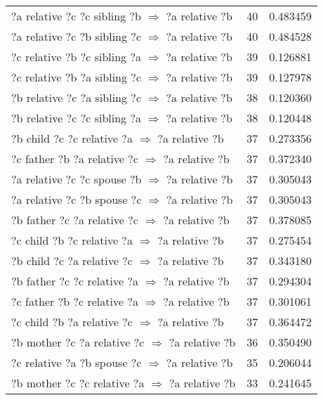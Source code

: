 \begin{longtable}{lrr}
 ?a  relative  ?c  ?c  sibling  ?b   $\Rightarrow$ ?a  relative  ?b &           40 &        0.483459 \\
 ?a  relative  ?c  ?b  sibling  ?c   $\Rightarrow$ ?a  relative  ?b &           40 &        0.484528 \\
 ?c  relative  ?b  ?c  sibling  ?a   $\Rightarrow$ ?a  relative  ?b &           39 &        0.126881 \\
 ?c  relative  ?b  ?a  sibling  ?c   $\Rightarrow$ ?a  relative  ?b &           39 &        0.127978 \\
 ?b  relative  ?c  ?a  sibling  ?c   $\Rightarrow$ ?a  relative  ?b &           38 &        0.120360 \\
 ?b  relative  ?c  ?c  sibling  ?a   $\Rightarrow$ ?a  relative  ?b &           38 &        0.120448 \\
   ?b  child  ?c  ?c  relative  ?a   $\Rightarrow$ ?a  relative  ?b &           37 &        0.273356 \\
  ?c  father  ?b  ?a  relative  ?c   $\Rightarrow$ ?a  relative  ?b &           37 &        0.372340 \\
  ?a  relative  ?c  ?c  spouse  ?b   $\Rightarrow$ ?a  relative  ?b &           37 &        0.305043 \\
  ?a  relative  ?c  ?b  spouse  ?c   $\Rightarrow$ ?a  relative  ?b &           37 &        0.305043 \\
  ?b  father  ?c  ?a  relative  ?c   $\Rightarrow$ ?a  relative  ?b &           37 &        0.378085 \\
   ?c  child  ?b  ?c  relative  ?a   $\Rightarrow$ ?a  relative  ?b &           37 &        0.275454 \\
   ?b  child  ?c  ?a  relative  ?c   $\Rightarrow$ ?a  relative  ?b &           37 &        0.343180 \\
  ?b  father  ?c  ?c  relative  ?a   $\Rightarrow$ ?a  relative  ?b &           37 &        0.294304 \\
  ?c  father  ?b  ?c  relative  ?a   $\Rightarrow$ ?a  relative  ?b &           37 &        0.301061 \\
   ?c  child  ?b  ?a  relative  ?c   $\Rightarrow$ ?a  relative  ?b &           37 &        0.364472 \\
  ?b  mother  ?c  ?a  relative  ?c   $\Rightarrow$ ?a  relative  ?b &           36 &        0.350490 \\
  ?c  relative  ?a  ?b  spouse  ?c   $\Rightarrow$ ?a  relative  ?b &           35 &        0.206044 \\
  ?b  mother  ?c  ?c  relative  ?a   $\Rightarrow$ ?a  relative  ?b &           33 &        0.241645 \\

\end{longtable}
